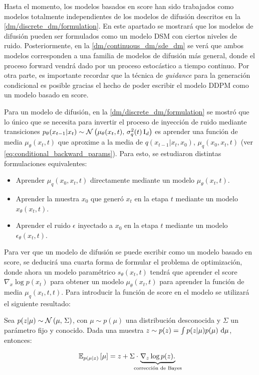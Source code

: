 Hasta el momento, los modelos basados en score han sido trabajados como modelos totalmente independientes de los modelos de difusión descritos en la \autoref{dm/discrete_dm/formulation}. En este apartado se mostrará que los modelos de difusión pueden ser formulados como un modelo DSM con ciertos niveles de ruido. Posteriormente, en la \autoref{dm/continuous_dm/sde_dm} se verá que ambos modelos corresponden a una familia de modelos de difusión más general, donde el proceso forward vendrá dado por un proceso estocástico a tiempo continuo. Por otra parte, es importante recordar que la técnica de \textit{guidance} para la generación condicional es posible gracias el hecho de poder escribir el modelo DDPM como un modelo basado en score.

Para un modelo de difusión, en la \autoref{dm/discrete_dm/formulation} se mostró que lo único que se necesita para invertir el proceso de inyección de ruido mediante transiciones $p_\theta(x_{t-1}|x_t)\sim\mathcal{N}\left(\mu_\theta(x_t,t),\,\sigma_q^2(t)\operatorname{I}_{d}\right)$ es aprender una función de media $\mu_\theta(x_t,t)$ que aproxime a la media de $q(x_{t-1}|x_t,x_0)$, $\mu_q(x_0,x_t,t)$ (ver \eqref{eq:conditional_backward_params}). Para esto, se estudiaron distintas formulaciones equivalentes:

\begin{itemize}
    \item Aprender $\mu_q(x_0,x_t,t)$ directamente mediante un modelo $\mu_\theta(x_t,t)$.
    \item Aprender la muestra $x_0$ que generó $x_t$ en la etapa $t$ mediante un modelo $x_\theta(x_t,t)$.
    \item Aprender el ruido $\epsilon$ inyectado a $x_0$ en la etapa $t$ mediante un modelo $\epsilon_\theta(x_t,t)$.
\end{itemize}

Para ver que un modelo de difusión se puede escribir como un modelo basado en score, se deducirá una cuarta forma de formular el problema de optimización, donde ahora un modelo paramétrico $s_\theta(x_t,t)$ tendrá que aprender el score $\nabla_x\log p(x_t)$ para obtener un modelo $\mu_\theta(x_t,t)$ para aprender la función de media $\mu_q(x_t,t,t)$. Para introducir la función de score en el modelo se utilizará el siguiente resultado:

\begin{teo}
    Sea $p(z|\mu)\sim\mathcal{N}\left(\mu,\,\Sigma\right)$, con $\mu\sim p(\mu)$ una distribución desconocida y $\Sigma$ un parámetro fijo y conocido. Dada una muestra $z\sim p(z)= \int p(z|\mu) p(\mu)\,\operatorname{d}\!\mu$, entonces:

    \begin{equation*}
        \E{p(\mu|z)}{\mu} = z + \Sigma \cdot\hspace{-.3cm} \underbrace{\nabla_z \log p(z).}_{\text{corrección de Bayes}} 
    \end{equation*}
\end{teo}

